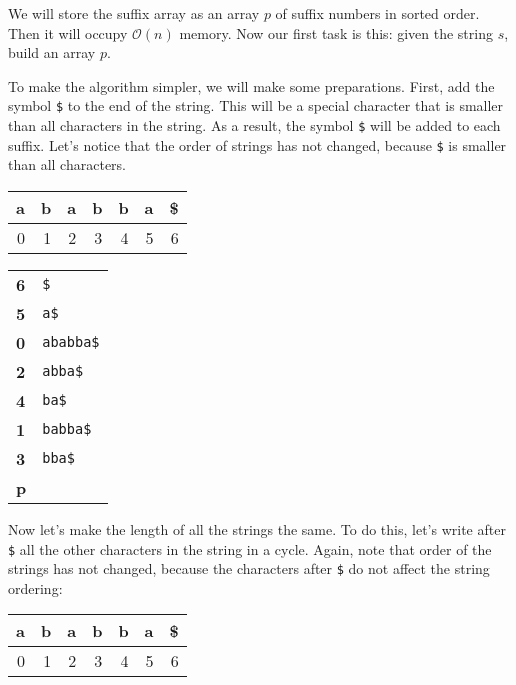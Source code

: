 \documentclass[11pt]{article}
\begin{document}
We will store the suffix array as an array \(p\) of suffix numbers in sorted order. Then it will
occupy \(\mathcal{O}(n)\) memory. Now our first task is this: given the string \(s\), build an array \(p\).

To make the algorithm simpler, we will make some preparations. First, add the symbol \texttt{\$} to the
end of the string. This will be a special character that is smaller than all characters in the
string. As a result, the symbol \texttt{\$} will be added to each suffix. Let's notice that the order of
strings has not changed, because \texttt{\$} is smaller than all characters.
\begin{center}
\begin{tabular}{rrrrrrr}
\textbf{a} & \textbf{b} & \textbf{a} & \textbf{b} & \textbf{b} & \textbf{a} & \textbf{\$}\\
\hline
0 & 1 & 2 & 3 & 4 & 5 & 6\\
\end{tabular}
\end{center}

\begin{center}
\begin{tabular}{ll}
\textbf{6} & \texttt{\$}\\
\textbf{5} & \texttt{a\$}\\
\textbf{0} & \texttt{ababba\$}\\
\textbf{2} & \texttt{abba\$}\\
\textbf{4} & \texttt{ba\$}\\
\textbf{1} & \texttt{babba\$}\\
\textbf{3} & \texttt{bba\$}\\
\textbf{p} & \\
\end{tabular}
\end{center}

Now let's make the length of all the strings the same. To do this, let's write after \texttt{\$} all the
other characters in the string in a cycle. Again, note that order of the strings has not changed,
because the characters after \texttt{\$} do not affect the string ordering:
\begin{center}
\begin{tabular}{rrrrrrr}
\textbf{a} & \textbf{b} & \textbf{a} & \textbf{b} & \textbf{b} & \textbf{a} & \textbf{\$}\\
\hline
0 & 1 & 2 & 3 & 4 & 5 & 6\\
\end{tabular}
\end{center}
\end{document}
